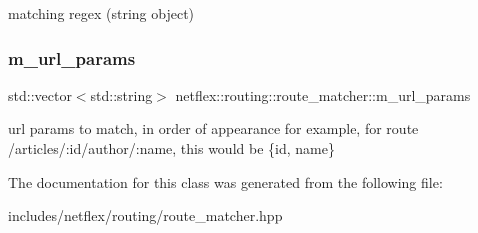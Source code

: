 matching regex (string object) \mbox{\label{classnetflex_1_1routing_1_1route__matcher_a33346356f8d0733e62aeb2986446606c}} 
\subsubsection{\texorpdfstring{m\+\_\+url\+\_\+params}{m\_url\_params}}
{\footnotesize\ttfamily std\+::vector$<$std\+::string$>$ netflex\+::routing\+::route\+\_\+matcher\+::m\+\_\+url\+\_\+params\hspace{0.3cm}{\ttfamily [protected]}}

url params to match, in order of appearance for example, for route /articles/\+:id/author/\+:name, this would be \{id, name\} 

The documentation for this class was generated from the following file\+:\begin{DoxyCompactItemize}
\item 
includes/netflex/routing/route\+\_\+matcher.\+hpp\end{DoxyCompactItemize}
